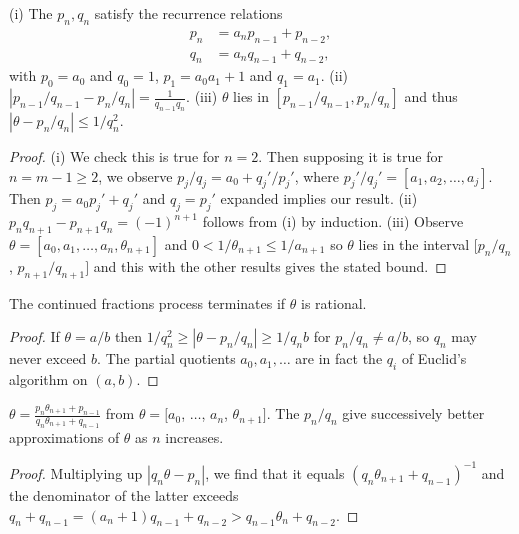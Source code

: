 \documentclass[a4paper, 10pt]{amsart}
\begin{document}
\begin{theorem}
    (i) The $p_n, q_n$ satisfy the recurrence relations
    \begin{align*}
        p_n &= a_n p_{n-1} + p_{n-2}, \\
        q_n &= a_n q_{n - 1} + q_{n-2},
    \end{align*}
    with $p_0 = a_0$ and $q_0 = 1$, $p_1 = a_0 a_1 + 1$ and $q_1 = a_1$. 
    (ii) $|p_{n-1}/q_{n-1} - p_n/q_n| = \frac{1}{q_{n - 1}q_n}$. (iii) $\theta$ lies in $[p_{n-1}/q_{n-1}, p_n/q_n]$ and thus $|\theta - p_n/q_n| \leq 1/q_n^2$.
\end{theorem}
\begin{proof}
    (i) We check this is true for $n = 2$.
    Then supposing it is true for $n = m - 1 \geq 2$, we observe $p_j/q_j = a_0 + q_j'/p_j'$, where $p_j'/q_j' = [a_1, a_2, \dots, a_j]$. Then $p_j = a_0 p_j' + q_j'$ and $q_j = p_j'$ expanded implies our result. (ii) $p_n q_{n +1} - p_{n+1}q_n = (-1)^{n + 1}$ follows from (i) by induction.
    (iii) Observe $\theta = [a_0, a_1, \dots, a_n, \theta_{n + 1}]$ and $0 < 1/\theta_{n + 1} \leq 1/a_{n + 1}$ so $\theta$ lies in the interval $[p_n/q_n$, $p_{n +1}/q_{n+1}]$ and this with the other results gives the stated bound.
\end{proof}

\begin{theorem}
    The continued fractions process terminates if $\theta$ is rational.
\end{theorem}
\begin{proof}
    If $\theta = a/b$ then $1/q_n^2 \geq |\theta - p_n/q_n| \geq 1/q_n b$ for $p_n/q_n \neq a/b$, so $q_n$ may never exceed $b$. The partial quotients $a_0, a_1, \dots$ are in fact the $q_i$ of Euclid's algorithm on $(a, b)$.
\end{proof}

\begin{theorem}
$\theta = \frac{p_n \theta_{n + 1} + p_{n - 1}}{q_n \theta_{n + 1} + q_{n - 1}}$ from $\theta = [a_0$, $\dots$, $a_n$, $\theta_{n + 1}]$. The $p_n/q_n$ give successively better approximations of $\theta$ as $n$ increases.  
\end{theorem}
\begin{proof}
  Multiplying up $|q_n \theta - p_n|$, we find that it equals $(q_n \theta_{n + 1}+q_{n - 1})^{-1}$ and the denominator of the latter exceeds $q_n + q_{n - 1} = (a_n + 1)q_{n - 1} + q_{n - 2} > q_{n - 1} \theta_n + q_{n - 2}$.
\end{proof}
\end{document}

